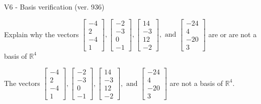 \begin{exercise}
  \begin{exerciseTitle}V6 - Basis verification (ver. 936)\end{exerciseTitle}
  \begin{exerciseStatement}
    Explain why the vectors \(\left[\begin{array}{r}
-4 \\
2 \\
-4 \\
1
\end{array}\right] , \left[\begin{array}{r}
-2 \\
-3 \\
0 \\
-1
\end{array}\right] , \left[\begin{array}{r}
14 \\
-3 \\
12 \\
-2
\end{array}\right] , \text{ and } \left[\begin{array}{r}
-24 \\
4 \\
-20 \\
3
\end{array}\right]\) are or are not a basis of \(\mathbb{R}^4\)	


  \end{exerciseStatement}
  \begin{exerciseAnswer}
   The vectors \(\left[\begin{array}{r}
-4 \\
2 \\
-4 \\
1
\end{array}\right] , \left[\begin{array}{r}
-2 \\
-3 \\
0 \\
-1
\end{array}\right] , \left[\begin{array}{r}
14 \\
-3 \\
12 \\
-2
\end{array}\right] , \text{ and } \left[\begin{array}{r}
-24 \\
4 \\
-20 \\
3
\end{array}\right]\) 
  	 are not  a basis of \(\mathbb{R}^4\).
  


  \end{exerciseAnswer}
\end{exercise}